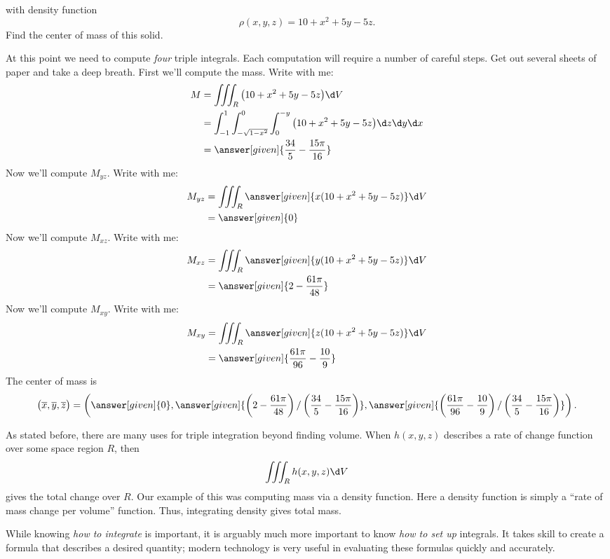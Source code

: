 \documentclass{ximera}
\begin{document}
\begin{example}
\begin{image}
  \end{image}
  with density function
  \[
  \rho(x,y,z) = 10 + x^2 + 5y -5z.
  \]
  Find the center of mass of this solid.
  \begin{explanation}
    At this point we need to compute \textit{four} triple
    integrals. Each computation will require a number of careful
    steps. Get out several sheets of paper and take a deep breath.
    First we'll compute the mass. Write with me:
    \begin{align*}
      M &= \iiint_R \big(10+x^2+5y-5z\big)\d V \\
      &= \int_{-1}^1\int_{-\sqrt{1-x^2}}^0\int_0^{-y} \big(10+x^2+5y-5z\big)\d z\d y \d x\\
      &= \answer[given]{\frac{34}{5}-\frac{15\pi}{16}}
    \end{align*}
    Now we'll compute $M_{yz}$. Write with me:
    \begin{align*}
      M_{yz}	&= \iiint_R \answer[given]{x(10+x^2+5y-5z)}\d V \\%
      &=\answer[given]{0}
    \end{align*}
    Now we'll compute $M_{xz}$. Write with me:
    \begin{align*}
      M_{xz} &= \iiint_R \answer[given]{y(10+x^2+5y-5z)}\d V\\
      &= \answer[given]{2-\frac{61\pi}{48}}
    \end{align*}
    Now we'll compute $M_{xy}$. Write with me:
  \begin{align*}
    M_{xy} &= \iiint_R \answer[given]{z(10+x^2+5y-5z)}\d V \\
    &= \answer[given]{\frac{61\pi}{96}-\frac{10}{9}}
  \end{align*}
  The center of mass is
  \[
  \big(\overline{x},\overline{y},\overline{z}\big) = \left(\answer[given]{0},\answer[given]{\left(2-\frac{61\pi}{48}\right)/\left(\frac{34}{5}-\frac{15\pi}{16}\right)},\answer[given]{\left(\frac{61\pi}{96}-\frac{10}{9}\right)/\left(\frac{34}{5}-\frac{15\pi}{16}\right)}\right).
  \]
  \end{explanation}
\end{example}

As stated before, there are many uses for triple integration beyond
finding volume. When $h(x,y,z)$ describes a rate of change function
over some space region $R$, then
\[
\iiint_R h(x,y,z)\d V
\]
gives the total change over $R$. Our example of this was computing
mass via a density function. Here a density function is simply a
``rate of mass change per volume'' function. Thus, integrating density
gives total mass.

While knowing \textit{how to integrate} is important, it is arguably
much more important to know \textit{how to set up} integrals. It takes
skill to create a formula that describes a desired quantity; modern
technology is very useful in evaluating these formulas quickly and
accurately.
\end{document}
